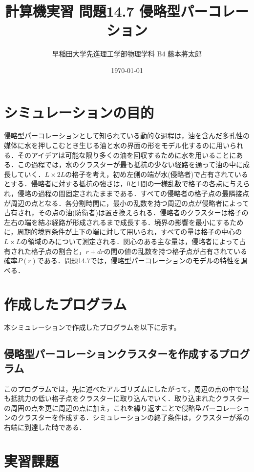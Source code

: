 \documentclass{jsarticle}
\title{計算機実習 問題14.7 侵略型パーコレーション}
\author{早稲田大学先進理工学部物理学科 B4 藤本將太郎}
\date{\today}
\begin{document}
\maketitle
    
\section{シミュレーションの目的}
    侵略型パーコレーションとして知られている動的な過程は，油を含んだ多孔性の媒体に水を押しこむとき生じる油と水の界面の形をモデル化するのに用いられる．そのアイデアは可能な限り多くの油を回収するために水を用いることにある．この過程では，水のクラスターが最も抵抗の少ない経路を通って油の中に成長していく．$L\times 2L$の格子を考え，初め左側の端が水(侵略者)で占有されているとする．侵略者に対する抵抗の強さは，0と1間の一様乱数で格子の各点に与えられ，侵略の過程の間固定されたままである．すべての侵略者の格子点の最隣接点が周辺の点となる．各分割時間に，最小の乱数を持つ周辺の点が侵略者によって占有され，その点の油(防衛者)は置き換えられる．侵略者のクラスターは格子の左右の端を結ぶ経路が形成されるまで成長する．境界の影響を最小にするために，周期的境界条件が上下の端に対して用いられ，すべての量は格子の中心の$L\times L$の領域のみについて測定される．関心のある主な量は，侵略者によって占有された格子点の割合と，$r+dr$の間の値の乱数を持つ格子点が占有されている確率$P(r)$である．問題14.7では，侵略型パーコレーションのモデルの特性を調べる．
    
\section{作成したプログラム}
    本シミュレーションで作成したプログラムを以下に示す。


    \subsection{侵略型パーコレーションクラスターを作成するプログラム}
        このプログラムでは，先に述べたアルゴリズムにしたがって，周辺の点の中で最も抵抗力の低い格子点をクラスターに取り込んでいく．取り込まれたクラスターの周囲の点を更に周辺の点に加え，これを繰り返すことで侵略型パーコレーションのクラスターを作成する．シミュレーションの終了条件は，クラスターが系の右端に到達した時である．
        
\section{実習課題}
\end{document}
